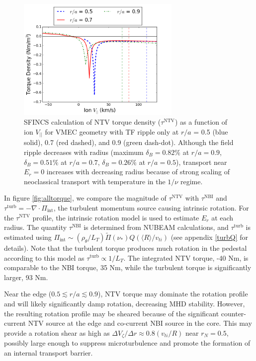 \documentclass[aip, pop, preprint]{revtex4-1}
\numberwithin{figure}{section}
\numberwithin{equation}{section}
\begin{document}
\begin{figure}[h!]
\centering
\includegraphics[width=0.7\textwidth]
{Torque_radiusscaling.png}
\caption{\label{fig:Torque_radiusscaling} SFINCS calculation of NTV torque density ($\tau^{\text{NTV}}$) as a function of ion $V_{||}$ for VMEC geometry with TF ripple only at $r/a$ = 0.5 (blue solid), 0.7 (red dashed), and 0.9 (green dash-dot). Although the field ripple decreases with radius (maximum $\delta_B = 0.82\%$ at $r/a = 0.9$, $\delta_B = 0.51\%$ at $r/a = 0.7$, $\delta_B = 0.26\%$ at $r/a = 0.5$), transport near $E_r = 0$ increases with decreasing radius because of strong scaling of neoclassical transport with temperature in the $1/\nu$ regime.\cite{Shaing2003}}
\end{figure}

In figure \ref{fig:alltorque}, we compare the magnitude of $\tau^{\text{NTV}}$ with $\tau^{\text{NBI}}$ and $\tau^{\text{turb}} = -\nabla \cdot \Pi_{\text{int}}$, the turbulent momentum source causing intrinsic rotation. For the $\tau^{\text{NTV}}$ profile, the intrinsic rotation model is used to estimate $E_r$ at each radius. The quantity $\tau^{\text{NBI}}$ is determined from NUBEAM calculations,\cite{Poli2014} and $\tau^{\text{turb}}$ is estimated using $\Pi_{\text{int}} \sim (\rho_{\theta}/L_T) \widetilde{\Pi}(\nu_*) Q (\langle R \rangle/v_{ti})$ (see appendix \ref{turbQ} for details). Note that the turbulent torque produces much rotation in the pedestal according to this model as $\tau^{\text{turb}} \propto 1/L_T$. The integrated NTV torque, -40 Nm, is comparable to the NBI torque, 35 Nm, while the turbulent torque is significantly larger, 93 Nm. 

Near the edge ($0.5 \lesssim r/a \lesssim 0.9$), NTV torque may dominate the rotation profile and will likely significantly damp rotation, decreasing MHD stability. However, the resulting rotation profile may be sheared because of the significant counter-current NTV source at the edge and co-current NBI source in the core. This may provide a rotation shear as high as $\Delta V_{\zeta}/ \Delta r \approx 0.8 (v_{ti}/R)$ near $r_N = 0.5$, possibly large enough to suppress microturbulence\cite{Hahm1994} and promote the formation of an internal transport barrier. 
\end{document}
